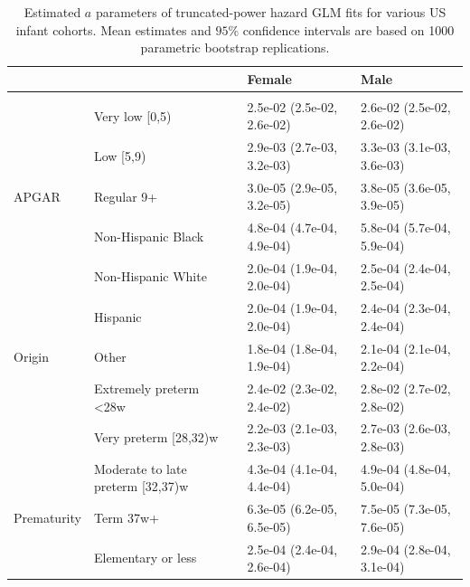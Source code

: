 \documentclass[10pt, twoside, parskip=half]{article}
\begin{document}
\begin{table}[t]

\caption{\label{tab:tab-ci-a}Estimated $a$ parameters of truncated-power hazard GLM fits for various US infant cohorts. Mean estimates and $95\%$ confidence intervals are based on 1000 parametric bootstrap replications.}
\centering
\begin{tabular}{llll}
\toprule
\textbf{} & \textbf{} & \textbf{Female} & \textbf{Male}\\
\midrule
\addlinespace[0.3em]
\multicolumn{4}{l}{\textbf{1995-1999}}\\
 & Very low [0,5) & 2.5e-02 (2.5e-02, 2.6e-02) & 2.6e-02 (2.5e-02, 2.6e-02)\\

 & Low [5,9) & 2.9e-03 (2.7e-03, 3.2e-03) & 3.3e-03 (3.1e-03, 3.6e-03)\\

\multirow{-3}{*}{\raggedright\arraybackslash \hspace{1em}APGAR} & Regular 9+ & 3.0e-05 (2.9e-05, 3.2e-05) & 3.8e-05 (3.6e-05, 3.9e-05)\\
\cmidrule{1-4}
 & Non-Hispanic Black & 4.8e-04 (4.7e-04, 4.9e-04) & 5.8e-04 (5.7e-04, 5.9e-04)\\

 & Non-Hispanic White & 2.0e-04 (1.9e-04, 2.0e-04) & 2.5e-04 (2.4e-04, 2.5e-04)\\

 & Hispanic & 2.0e-04 (1.9e-04, 2.0e-04) & 2.4e-04 (2.3e-04, 2.4e-04)\\

\multirow{-4}{*}{\raggedright\arraybackslash \hspace{1em}Origin} & Other & 1.8e-04 (1.8e-04, 1.9e-04) & 2.1e-04 (2.1e-04, 2.2e-04)\\
\cmidrule{1-4}
 & Extremely preterm <28w & 2.4e-02 (2.3e-02, 2.4e-02) & 2.8e-02 (2.7e-02, 2.8e-02)\\

 & Very preterm [28,32)w & 2.2e-03 (2.1e-03, 2.3e-03) & 2.7e-03 (2.6e-03, 2.8e-03)\\

 & Moderate to late preterm [32,37)w & 4.3e-04 (4.1e-04, 4.4e-04) & 4.9e-04 (4.8e-04, 5.0e-04)\\

\multirow{-4}{*}{\raggedright\arraybackslash \hspace{1em}Prematurity} & Term 37w+ & 6.3e-05 (6.2e-05, 6.5e-05) & 7.5e-05 (7.3e-05, 7.6e-05)\\
\cmidrule{1-4}
 & Elementary or less & 2.5e-04 (2.4e-04, 2.6e-04) & 2.9e-04 (2.8e-04, 3.1e-04)\\


\end{tabular}
\end{table}
\end{document}
